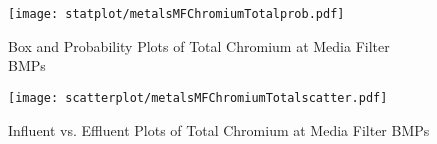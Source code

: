        \begin{figure}[hb]   %
            \centering
            \texttt{[image: statplot/metalsMFChromiumTotalprob.pdf]}
            \caption{Box and Probability Plots of Total Chromium at Media Filter BMPs}
        \end{figure}         %
        
        
        \begin{figure}[hb]   %
            \centering
            \texttt{[image: scatterplot/metalsMFChromiumTotalscatter.pdf]}
            \caption{Influent vs. Effluent Plots of Total Chromium at Media Filter BMPs}
        \end{figure}         %
        \clearpage
        